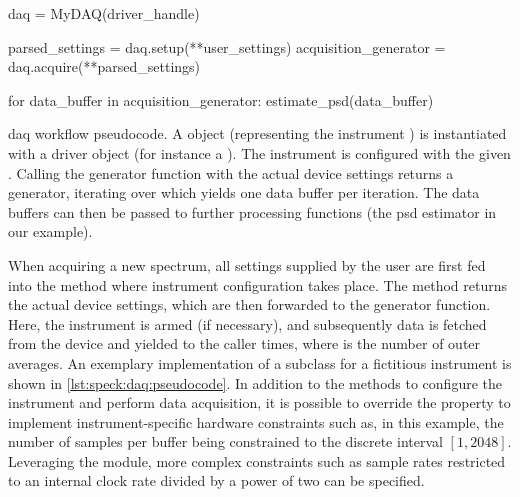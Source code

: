 \begin{listing}[htpb]
    \begin{py}
        daq = MyDAQ(driver_handle)

        parsed_settings = daq.setup(**user_settings)
        acquisition_generator = daq.acquire(**parsed_settings)

        for data_buffer in acquisition_generator:
            estimate_psd(data_buffer)
    \end{py}
    \caption[\gls{daq} workflow pseudocode]{
        \gls{daq} workflow pseudocode.
        A  object (representing the instrument ) is instantiated with a driver object (for instance a \href{https://github.com/microsoft/qcodes}{\qcodes} ).
        The instrument is configured with the given .
        Calling the generator function  with the actual device settings returns a generator, iterating over which yields one data buffer per iteration.
        The data buffers can then be passed to further processing functions (the \gls{psd} estimator in our example).
    }
    \label{lst:speck:daq:workflow}
\end{listing}

When acquiring a new spectrum, all settings supplied by the user are first fed into the  method where instrument configuration takes place.
The method returns the actual device settings,
which are then forwarded to the  generator function.
Here, the instrument is armed (if necessary), and subsequently data is fetched from the device and yielded to the caller  times, where  is the number of outer averages.
An exemplary implementation of a  subclass for a fictitious instrument is shown in \cref{lst:speck:daq:pseudocode}.
In addition to the methods to configure the instrument and perform data acquisition, it is possible to override the  property to implement instrument-specific hardware constraints such as, in this example, the number of samples per buffer being constrained to the discrete interval $[1, 2048]$.
Leveraging the  module, more complex constraints such as sample rates restricted to an internal clock rate divided by a power of two
can be specified.

